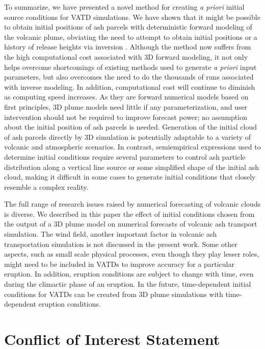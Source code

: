 \documentclass[utf8]{frontiersSCNS} %
\begin{document}
To summarize, we have presented a novel method for creating \textit{a priori} initial source conditions for VATD simulations. We have shown that it might be possible to obtain initial positions of ash parcels with deterministic forward modeling of the volcanic plume, obviating the need to attempt to obtain initial positions or a history of release heights via inversion \citep{stohl2011determination}. Although the method now suffers from the high computational cost associated with 3D forward modeling, it not only helps overcome shortcomings of existing methods used to generate \textit{a priori} input parameters, but also overcomes the need to do the thousands of runs associated with inverse modeling. In addition, computational cost will continue to diminish as computing speed increases. As they are forward numerical models based on first principles, 3D plume models need little if any parameterization, and user intervention should not be required to improve forecast power; no assumption about the initial position of ash parcels is needed. Generation of the initial cloud of ash parcels directly by 3D simulation is potentially adaptable to a variety of volcanic and atmospheric scenarios. In contrast, semiempirical expressions used to determine initial conditions require several parameters to control ash particle distribution along a vertical line source or some simplified shape of the initial ash cloud, making it difficult in some cases to generate initial conditions that closely resemble a complex reality.

The full range of research issues raised by numerical forecasting of volcanic clouds is diverse. We described in this paper the effect of initial conditions chosen from the output of a 3D plume model on numerical forecasts of volcanic ash transport simulation. The wind field, another important factor in volcanic ash transportation simulation is not discussed in the present work. Some other aspects, such as small scale physical processes, even though they play lesser roles, might need to be included in VATDs to improve accuracy for a particular eruption. In addition, eruption conditions are subject to change with time, even during the climactic phase of an eruption. In the future, time-dependent initial conditions for VATDs can be created from 3D plume simulations with time-dependent eruption conditions.

\section*{Conflict of Interest Statement}
\end{document}
